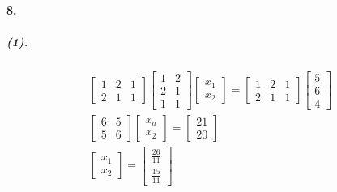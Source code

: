 \documentclass[UTF8]{ctexart}
\begin{document}
	\paragraph{8.}
	\subparagraph{(1).}
	\begin{displaymath}
	\begin{gathered}
		\begin{bmatrix}
			1 & 2 & 1\\
			2 & 1 & 1
		\end{bmatrix}
		\begin{bmatrix}
			1 & 2\\
			2 & 1\\
			1 & 1
		\end{bmatrix}
		\begin{bmatrix}
			x_1\\x_2
		\end{bmatrix}
		=
		\begin{bmatrix}
			1 & 2 & 1\\
			2 & 1 & 1
		\end{bmatrix}
		\begin{bmatrix}
			5\\6\\4
		\end{bmatrix}
		\\
		\begin{bmatrix}
			6 & 5\\
			5 & 6
		\end{bmatrix}
		\begin{bmatrix}
			x_a\\x_2
		\end{bmatrix}
		=
		\begin{bmatrix}
			21\\20
		\end{bmatrix}
		\\
		\begin{bmatrix}
			x_1\\x_2
		\end{bmatrix}
		=
		\begin{bmatrix}
			\frac{26}{11}\\\frac{15}{11}
		\end{bmatrix}
	\end{gathered}
	\end{displaymath}
\end{document}
